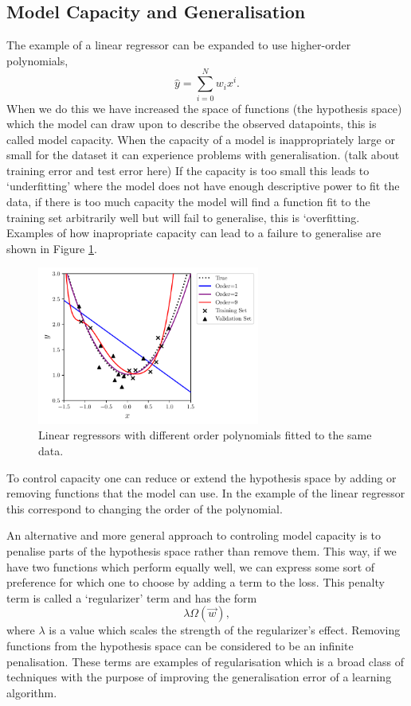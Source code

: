 \subsection{Model Capacity and Generalisation}
The example of a linear regressor can be expanded to use higher-order polynomials,
\begin{equation}
    \hat{y} = \sum_{i=0}^{N}w_{i}x^{i}.
\end{equation}
When we do this we have increased the space of functions (the hypothesis space) which the model can draw upon to describe the observed datapoints, this is called model capacity.
When the capacity of a model is inappropriately large or small for the dataset it can experience problems with generalisation.
(talk about training error and test error here)
If the capacity is too small this leads to `underfitting' where the model does not have enough descriptive power to fit the data, if there is too much capacity the model will find a function fit to the training set arbitrarily well but will fail to generalise, this is `overfitting. Examples of how inapropriate capacity can lead to a failure to generalise are shown in Figure \ref{fig:machine_learning:overfitting}.
\begin{figure}[h!]
        \includegraphics[width=0.65\textwidth]{figures/machine_learning/capacity.pdf}
    \caption{Linear regressors with different order polynomials fitted to the same data. }
        \label{fig:machine_learning:overfitting}
\end{figure}


To control capacity one can reduce or extend the hypothesis space by adding or removing functions that the model can use. In the example of the linear regressor this correspond to changing the order of the polynomial. 

An alternative and more general approach to controling model capacity is to penalise parts of the hypothesis space rather than remove them. This way, if we have two functions which perform equally well, we can express some sort of preference for which one to choose by adding a term to the loss. This penalty term is called a `regularizer' term and has the form
\begin{equation}
    \lambda\Omega(\vec{w}),
\end{equation}
where $\lambda$ is a value which scales the strength of the regularizer's effect. Removing functions from the hypothesis space can be considered to be an infinite penalisation. These terms are examples of regularisation which is a broad class of techniques with the purpose of improving the generalisation error of a learning algorithm. 


